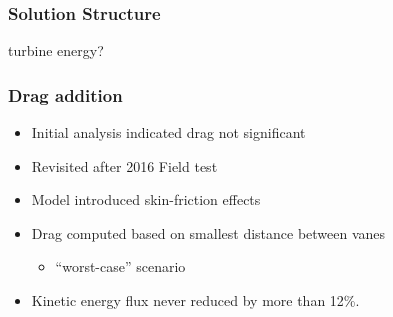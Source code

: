 \documentclass[mathserif]{beamer}
\begin{document}
%
%
\begin{frame}
 \frametitle{Solution Structure}

 turbine energy?

\end{frame}




%
%
%
\begin{frame}
 \frametitle{Drag addition}
\begin{itemize}
 \item Initial analysis indicated drag not significant
 \item Revisited after 2016 Field test
 \item Model introduced skin-friction effects
 \item Drag computed based on smallest distance between vanes
       \begin{itemize}
	\item ``worst-case'' scenario
       \end{itemize}
 \item Kinetic energy flux never reduced by more than 12\%.
\end{itemize}


\end{frame}
\end{document}
